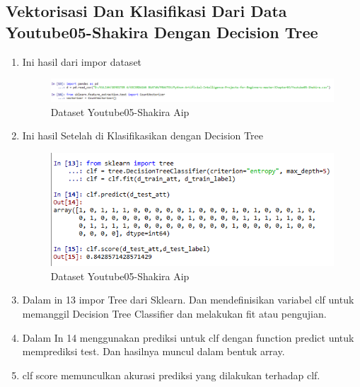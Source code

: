 \subsection{ Vektorisasi Dan Klasifikasi Dari Data Youtube05-Shakira Dengan Decision Tree}
\begin{enumerate}
\item Ini hasil dari impor dataset
\begin{figure}[!hbtp]
\centering
\includegraphics[scale=0.5]{figures/AIP/c7.PNG}
\caption{Dataset Youtube05-Shakira Aip}
\label{Praktek}
\end{figure}
\item Ini hasil Setelah di Klasifikasikan dengan Decision Tree
\begin{figure}[!hbtp]
\centering
\includegraphics[scale=0.5]{figures/AIP/c6.PNG}
\caption{Dataset Youtube05-Shakira Aip}
\label{Praktek}
\end{figure}
\item Dalam in 13 impor Tree dari Sklearn. Dan mendefinisikan variabel clf untuk memanggil Decision Tree Classifier dan melakukan fit atau pengujian.
\item Dalam In 14 menggunakan prediksi untuk clf dengan function predict  untuk memprediksi test. Dan hasilnya muncul dalam bentuk array.
\item clf score memunculkan akurasi prediksi yang dilakukan terhadap clf.
\end{enumerate}

